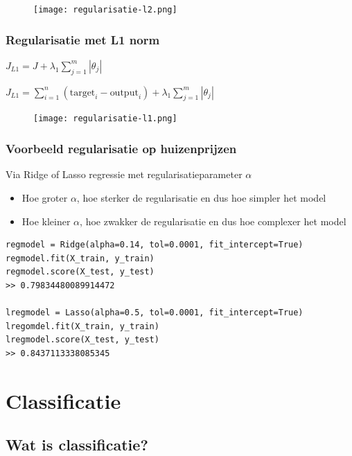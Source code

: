 \documentclass{article}
\begin{document}
\begin{figure}[H]
    \centering
    \texttt{[image: regularisatie-l2.png]}
    \caption{}
\end{figure}

\subsubsection{Regularisatie met L1 norm}

\begin{center}
$J_{L1} = J + \lambda_1 \sum_{j=1}^m |\theta_j|$

$J_{L1} = \sum_{i=1}^n (\text{target}_i - \text{output}_i) + \lambda_1 \sum_{j=1}^m |\theta_j|$
\end{center}


\begin{figure}[H]
    \centering
    \texttt{[image: regularisatie-l1.png]}
    \caption{}
\end{figure}

\subsubsection{Voorbeeld regularisatie op huizenprijzen}

Via Ridge of Lasso regressie met regularisatieparameter $\alpha$

\begin{itemize}
    \item Hoe groter $\alpha$, hoe sterker de regularisatie en dus hoe simpler het model
    \item Hoe kleiner $\alpha$, hoe zwakker de regularisatie en dus hoe complexer het model
\end{itemize}

\begin{verbatim}
regmodel = Ridge(alpha=0.14, tol=0.0001, fit_intercept=True)
regmodel.fit(X_train, y_train)
regmodel.score(X_test, y_test)
>> 0.79834480089914472

lregmodel = Lasso(alpha=0.5, tol=0.0001, fit_intercept=True)
lregomdel.fit(X_train, y_train)
lregmodel.score(X_test, y_test)
>> 0.8437113338085345
\end{verbatim}

\section{Classificatie}

\subsection{Wat is classificatie?}
\end{document}

